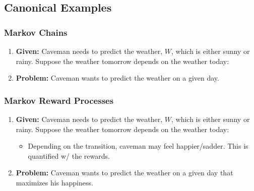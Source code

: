\subsection{Canonical Examples}
\subsubsection{Markov Chains}
\begin{example}
    \begin{enumerate}
        \item \textbf{Given:} Caveman needs to predict the weather, $W$, which is either sunny or rainy. Suppose the weather tomorrow depends on the weather today:
        \item \textbf{Problem:} Caveman wants to predict the weather on a given day.
    \end{enumerate}
\end{example}

\subsubsection{Markov Reward Processes}
\begin{example}
    \begin{enumerate}
        \item \textbf{Given:} Caveman needs to predict the weather, $W$, which is either sunny or rainy. Suppose the weather tomorrow depends on the weather today:
        \begin{itemize}
            \item Depending on the transition, caveman may feel happier/sadder. This is quantified w/ the rewards.
        \end{itemize}
        \item \textbf{Problem:} Caveman wants to predict the weather on a given day that maximizes his happiness.
    \end{enumerate}
\end{example}
\newpage

